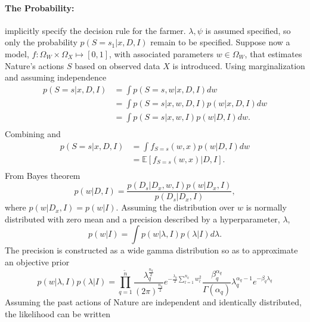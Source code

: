 \begin{example}
	\paragraph{The Probability:}  implicitly specify the decision rule for the farmer. $\lambda,\psi$ is assumed specified, so only the probability $p(S= s_1|x,D,I)$ remain to be specified. Suppose now a model, $f: \Omega_W\times \Omega_X\mapsto[0,1]$, with associated parameters $w\in \Omega_W$, that estimates Nature's actions $S$ based on observed data $X$ is introduced. Using marginalization and assuming independence 
	\begin{equation}
		\begin{split}
			p(S= s|x,D,I) &= \int p(S= s,w|x,D,I) dw \\
			& = \int p(S= s|x,w,D,I)  p(w|x,D,I)dw \\
			& = \int p(S= s|x,w,I)  p(w|D,I)dw. \\
		\end{split}
		\label{eq:q5a}
	\end{equation}
	Combining  and 
	\begin{equation}
		\begin{split}
			p(S= s|x,D,I) & = \int f_{S = s}(w,x)  p(w|D,I)dw \\
			& = \mathbb{E}[f_{S = s}(w,x)|D,I].\\
		\end{split}
	\end{equation}
	From Bayes theorem 
	\begin{equation}
		p(w|D,I) =\frac{p(D_s|D_x,w,I)p(w|D_x,I)}{p(D_s|D_x,I)},
	\end{equation}
	where $p(w|D_x,I) = p(w|I)$. Assuming the distribution over $w$ is normally distributed with zero mean and a precision described by a hyperparameter, $\lambda$, 
	\begin{equation}
		p(w|I) = \int p(w|\lambda,I)p(\lambda|I)d\lambda.
		\label{eq:lambda}
	\end{equation}
	The precision is constructed as a wide gamma distribution so as to approximate an objective prior
	\begin{equation}
		p(w|\lambda,I)p(\lambda|I)
		= \prod_{q=1}^{\tilde{n}} \frac{\lambda_q^\frac{n_q}{2}}{(2\pi)^\frac{n_q}{2}}e^{-\frac{\lambda_q}{2}\sum_{l=1}^{n_q}w_l^2}\frac{\beta_q^{\alpha_q}}{\Gamma(\alpha_q)}\lambda_q^{\alpha_q-1}e^{-\beta_q \lambda_q}
		\label{eq:priora}
	\end{equation}
	Assuming the past actions of Nature are independent and identically distributed, the likelihood can be written 

\end{example}
